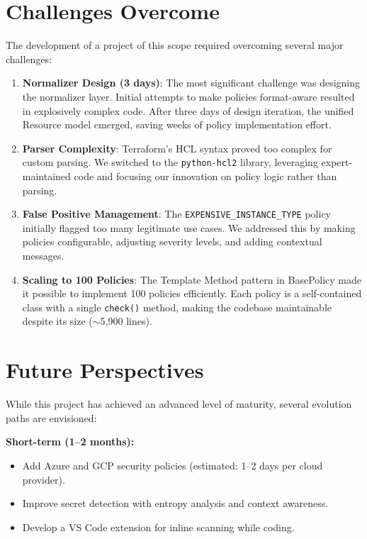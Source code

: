\section*{Challenges Overcome}

The development of a project of this scope required overcoming several major challenges:

\begin{enumerate}
    \item \textbf{Normalizer Design (3 days)}: The most significant challenge was designing the normalizer layer. Initial attempts to make policies format-aware resulted in explosively complex code. After three days of design iteration, the unified Resource model emerged, saving weeks of policy implementation effort.
    
    \item \textbf{Parser Complexity}: Terraform's HCL syntax proved too complex for custom parsing. We switched to the \texttt{python-hcl2} library, leveraging expert-maintained code and focusing our innovation on policy logic rather than parsing.
    
    \item \textbf{False Positive Management}: The \texttt{EXPENSIVE\_INSTANCE\_TYPE} policy initially flagged too many legitimate use cases. We addressed this by making policies configurable, adjusting severity levels, and adding contextual messages.
    
    \item \textbf{Scaling to 100 Policies}: The Template Method pattern in BasePolicy made it possible to implement 100 policies efficiently. Each policy is a self-contained class with a single \texttt{check()} method, making the codebase maintainable despite its size ($\sim$5,900 lines).
\end{enumerate}

\section*{Future Perspectives}

While this project has achieved an advanced level of maturity, several evolution paths are envisioned:

\textbf{Short-term (1--2 months):}
\begin{itemize}
    \item Add Azure and GCP security policies (estimated: 1--2 days per cloud provider).
    \item Improve secret detection with entropy analysis and context awareness.
    \item Develop a VS Code extension for inline scanning while coding.
\end{itemize}


